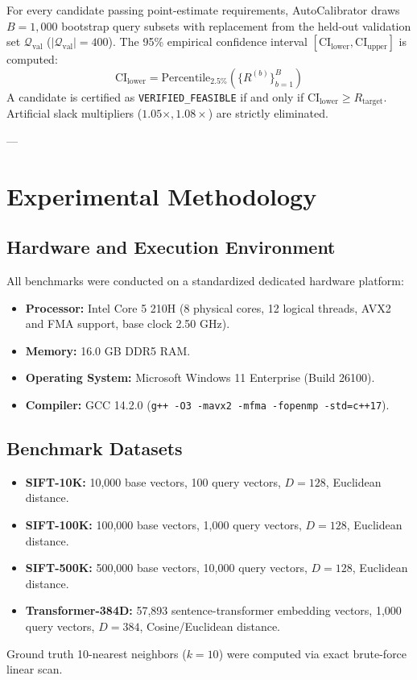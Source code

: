 \documentclass[10pt,journal,compsoc]{IEEEtran}
\begin{document}
For every candidate passing point-estimate requirements, AutoCalibrator draws $B=1{,}000$ bootstrap query subsets with replacement from the held-out validation set $\mathcal{Q}_{\text{val}}$ ($|\mathcal{Q}_{\text{val}}| = 400$). The 95\% empirical confidence interval $[\text{CI}_{\text{lower}}, \text{CI}_{\text{upper}}]$ is computed:
\begin{equation}
\text{CI}_{\text{lower}} = \text{Percentile}_{2.5\%}\left( \{ R^{(b)} \}_{b=1}^B \right)
\end{equation}
A candidate is certified as \texttt{VERIFIED\_FEASIBLE} if and only if $\text{CI}_{\text{lower}} \ge R_{\text{target}}$. Artificial slack multipliers ($1.05\times, 1.08\times$) are strictly eliminated.

---

\section{Experimental Methodology}
\label{sec:experimental_setup}

\subsection{Hardware and Execution Environment}
All benchmarks were conducted on a standardized dedicated hardware platform:
\begin{itemize}
    \item \textbf{Processor:} Intel Core 5 210H (8 physical cores, 12 logical threads, AVX2 and FMA support, base clock 2.50 GHz).
    \item \textbf{Memory:} 16.0 GB DDR5 RAM.
    \item \textbf{Operating System:} Microsoft Windows 11 Enterprise (Build 26100).
    \item \textbf{Compiler:} GCC 14.2.0 (\texttt{g++ -O3 -mavx2 -mfma -fopenmp -std=c++17}).
\end{itemize}

\subsection{Benchmark Datasets}
\begin{itemize}
    \item \textbf{SIFT-10K:} 10,000 base vectors, 100 query vectors, $D=128$, Euclidean distance.
    \item \textbf{SIFT-100K:} 100,000 base vectors, 1,000 query vectors, $D=128$, Euclidean distance.
    \item \textbf{SIFT-500K:} 500,000 base vectors, 10,000 query vectors, $D=128$, Euclidean distance.
    \item \textbf{Transformer-384D:} 57,893 sentence-transformer embedding vectors, 1,000 query vectors, $D=384$, Cosine/Euclidean distance.
\end{itemize}
Ground truth 10-nearest neighbors ($k=10$) were computed via exact brute-force linear scan.
\end{document}
